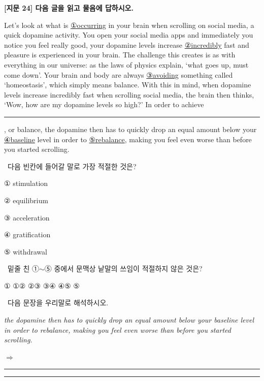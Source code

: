\documentclass[11pt,a4paper]{article}
\newcommand{\qno}[1]{\par\vspace{8pt}\noindent{\sffamily\bfseries #1.}\ }
\newcommand{\instr}[1]{{\sffamily #1}\par\vspace{3pt}}
\begin{document}
\begin{center}
{\fontsize{15}{17}\selectfont\sffamily\bfseries [지문 24] 다음 글을 읽고 물음에 답하시오.}
\end{center}
\vspace{4pt}

\begin{pbox}
Let's look at what is \underline{①occurring} in your brain when scrolling on social media, a quick dopamine activity. You open your social media apps and immediately you notice you feel really good, your dopamine levels increase \underline{②incredibly} fast and pleasure is experienced in your brain. The challenge this creates is as with everything in our universe: as the laws of physics explain, `what goes up, must come down'. Your brain and body are always \underline{③avoiding} something called `homeostasis', which simply means balance. With this in mind, when dopamine levels increase incredibly fast when scrolling social media, the brain then thinks, `Wow, how are my dopamine levels so high?' In order to achieve \rule{3.5cm}{0.4pt}, or balance, the dopamine then has to quickly drop an equal amount below your \underline{④baseline} level in order to \underline{⑤rebalance}, making you feel even worse than before you started scrolling.
\end{pbox}

\qno{1}\instr{다음 빈칸에 들어갈 말로 가장 적절한 것은?}
\begin{choices}
\item ① stimulation
\item ② equilibrium
\item ③ acceleration
\item ④ gratification
\item ⑤ withdrawal
\end{choices}

\qno{2}\instr{밑줄 친 ①$\sim$⑤ 중에서 문맥상 낱말의 쓰임이 적절하지 않은 것은?}
\begin{choices}
\item ① ①\quad ② ②\quad ③ ③\quad ④ ④\quad ⑤ ⑤
\end{choices}

\qno{3}\instr{[서술형] 다음 문장을 우리말로 해석하시오.}
\vspace{2pt}\par\noindent
\hspace{1em}\textit{the dopamine then has to quickly drop an equal amount below your baseline level in order to rebalance, making you feel even worse than before you started scrolling.}
\par\vspace{6pt}\noindent
$\Rightarrow$ \rule{\linewidth}{0.4pt}
\par\vspace{4pt}\noindent
\rule{\linewidth}{0.4pt}
\end{document}
